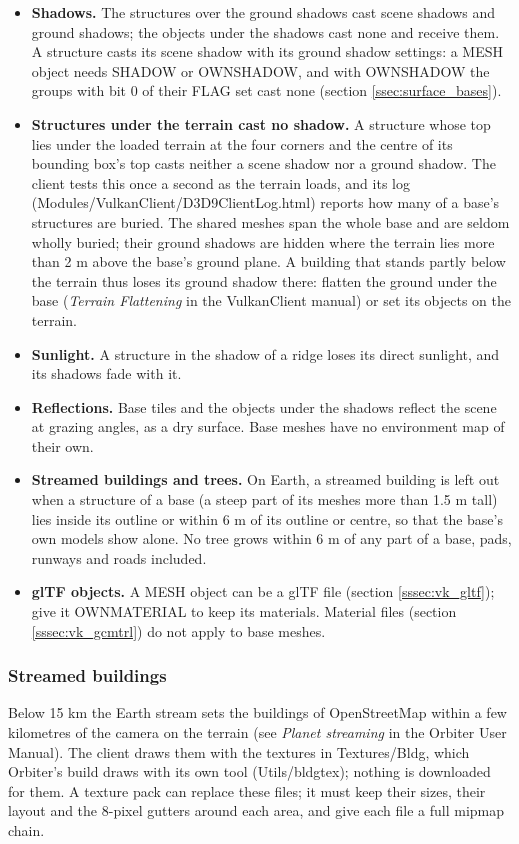 \documentclass[Orbiter Developer Manual.tex]{subfiles}
\begin{document}
\begin{sloppypar}
\begin{itemize}
\item \textbf{Shadows.} The structures over the ground shadows cast scene shadows and ground shadows; the objects under the shadows cast none and receive them. A structure casts its scene shadow with its ground shadow settings: a MESH object needs SHADOW or OWNSHADOW, and with OWNSHADOW the groups with bit 0 of their FLAG set cast none (section \ref{ssec:surface_bases}).
\item \textbf{Structures under the terrain cast no shadow.} A structure whose top lies under the loaded terrain at the four corners and the centre of its bounding box's top casts neither a scene shadow nor a ground shadow. The client tests this once a second as the terrain loads, and its log (Modules/VulkanClient/D3D9ClientLog.html) reports how many of a base's structures are buried. The shared meshes span the whole base and are seldom wholly buried; their ground shadows are hidden where the terrain lies more than 2 m above the base's ground plane. A building that stands partly below the terrain thus loses its ground shadow there: flatten the ground under the base (\textit{Terrain Flattening} in the VulkanClient manual) or set its objects on the terrain.
\item \textbf{Sunlight.} A structure in the shadow of a ridge loses its direct sunlight, and its shadows fade with it.
\item \textbf{Reflections.} Base tiles and the objects under the shadows reflect the scene at grazing angles, as a dry surface. Base meshes have no environment map of their own.
\item \textbf{Streamed buildings and trees.} On Earth, a streamed building is left out when a structure of a base (a steep part of its meshes more than 1.5 m tall) lies inside its outline or within 6 m of its outline or centre, so that the base's own models show alone. No tree grows within 6 m of any part of a base, pads, runways and roads included.
\item \textbf{glTF objects.} A MESH object can be a glTF file (section \ref{sssec:vk_gltf}); give it OWNMATERIAL to keep its materials. Material files (section \ref{sssec:vk_gcmtrl}) do not apply to base meshes.
\end{itemize}


\subsubsection{Streamed buildings}
Below 15 km the Earth stream sets the buildings of OpenStreetMap within a few kilometres of the camera on the terrain (see \textit{Planet streaming} in the Orbiter User Manual). The client draws them with the textures in Textures/Bldg, which Orbiter's build draws with its own tool (Utils/bldgtex); nothing is downloaded for them. A texture pack can replace these files; it must keep their sizes, their layout and the 8-pixel gutters around each area, and give each file a full mipmap chain.


\end{sloppypar}
\end{document}
